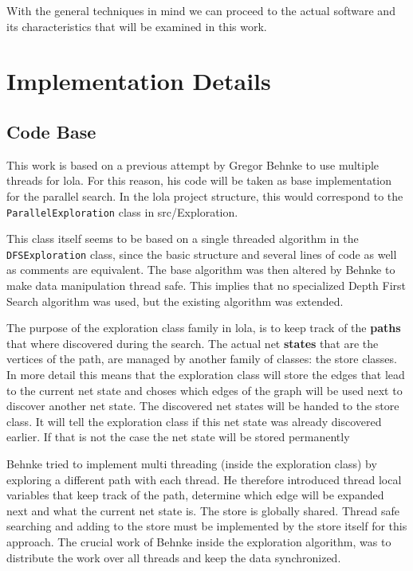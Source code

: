 With the general techniques in mind we can proceed to the actual software and its characteristics that will be examined in this work.

\section{Implementation Details}
\subsection{Code Base}
This work is based on a previous attempt by Gregor Behnke to use multiple threads for lola. For this reason, his code will be taken as base implementation for the parallel search. In the lola project structure, this would correspond to the \texttt{ParallelExploration} class in src/Exploration.

This class itself seems to be based on a single threaded algorithm in the \texttt{DFSExploration} class, since the basic structure and several lines of code as well as comments are equivalent. The base algorithm was then altered by Behnke to make data manipulation thread safe. This implies that no specialized Depth First Search algorithm was used, but the existing algorithm was extended.

The purpose of the exploration class family in lola, is to keep track of the \textbf{paths} that where discovered during the search. The actual net \textbf{states} that are the vertices of the path, are managed by another family of classes: the store classes. In more detail this means that the exploration class will store the edges that lead to the current net state and choses which edges of the graph will be used next to discover another net state. The discovered net states will be handed to the store class. It will tell the exploration class if this net state was already discovered earlier. If that is not the case the net state will be stored permanently

Behnke tried to implement multi threading (inside the exploration class) by exploring a different path with each thread. He therefore introduced thread local variables that keep track of the path, determine which edge will be expanded next and what the current net state is. The store is globally shared. Thread safe searching and adding to the store must be implemented by the store itself for this approach. The crucial work of Behnke inside the exploration algorithm, was to distribute the work over all threads and keep the data synchronized.

